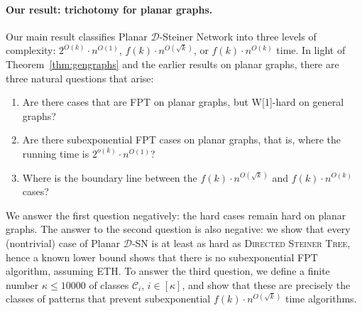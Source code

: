 \documentclass[a4paper,11pt]{article}
\newcommand{\calD}{\mathcal{D}}
\theoremstyle{plain}
\newtheorem{identification rule}{Identification Rule}
\theoremstyle{definition}
\theoremstyle{remark}
\newcommand{\Dsnfull}{{\sc Planar $\calD$-Steiner Network}\xspace}
\newcommand{\Dsn}{{\sc Planar $\calD$-SN}\xspace}
\begin{document}
\paragraph{Our result: trichotomy for planar graphs.}
Our main result classifies \Dsnfull into three levels of complexity: 
$2^{O(k)}\cdot n^{O(1)}$, $f(k)\cdot n^{O(\sqrt{k})}$, or $f(k)\cdot n^{O(k)}$ time.
In light of Theorem~\ref{thm:gengraphs} and the earlier results on planar graphs, there are three natural questions that arise:
\begin{enumerate}
\item Are there cases that are FPT on planar graphs, but W[1]-hard on general graphs?
  \item Are there subexponential FPT cases on planar graphs, that is, where the running time is $2^{o(k)}\cdot n^{O(1)}$?
\item Where is the boundary line between the $f(k) \cdot n^{O(\sqrt{k})}$ and $f(k)\cdot n^{O(k)}$ cases?
\end{enumerate}
We answer the first question negatively: the hard cases remain hard on planar graphs. The answer to the second question is also negative: we show that every (nontrivial) case of \Dsn is at least as hard as \textsc{Directed Steiner Tree}, hence a known lower bound \cite{DBLP:conf/focs/MarxPP18} shows that there is no subexponential FPT algorithm, assuming ETH. 
To answer the third question, we define a finite number $\kappa\le 10000$ of classes $\mathcal{C}_i$, $i\in[\kappa]$, and show that these are precisely the classes of patterns that prevent subexponential $f(k) \cdot n^{O(\sqrt{k})}$ time algorithms.
\medskip
\end{document}
